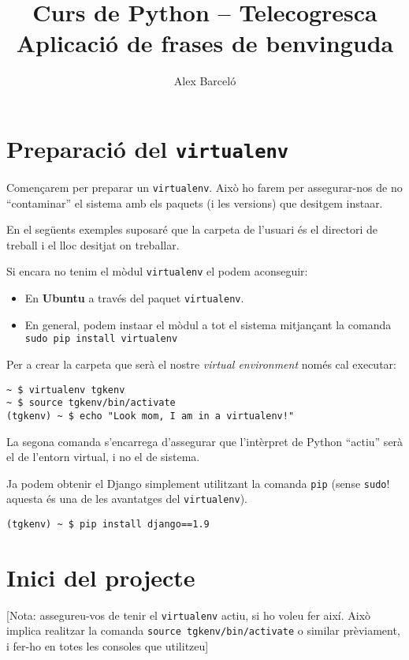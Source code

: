 \documentclass[12pt,a4paper]{article}
\author{Alex Barceló}
\title{Curs de Python -- Telecogresca \\ {\sc Aplicació de frases de benvinguda}}
\begin{document}
\maketitle

\setcounter{section}{-1}
\section{Preparació del \texttt{virtualenv}}

Començarem per preparar un \verb+virtualenv+. Això ho farem per assegurar-nos de no ``contaminar'' el sistema amb els paquets (i les versions) que desitgem insta\lgem{}ar.

En el següents exemples suposaré que la carpeta de l'usuari és el directori de treball i el lloc desitjat on treballar.

Si encara no tenim el mòdul \verb+virtualenv+ el podem aconseguir:
\begin{itemize}
\item En \textbf{Ubuntu} a través del paquet \verb+virtualenv+.
\item En general, podem insta\lgem{}ar el mòdul a tot el sistema mitjançant la comanda \verb+sudo pip install virtualenv+
\end{itemize}

Per a crear la carpeta que serà el nostre \emph{virtual environment} només cal executar:

\begin{verbatim}
~ $ virtualenv tgkenv
~ $ source tgkenv/bin/activate
(tgkenv) ~ $ echo "Look mom, I am in a virtualenv!"
\end{verbatim}

La segona comanda s'encarrega d'assegurar que l'intèrpret de Python ``actiu'' serà el de l'entorn virtual, i no el de sistema.

Ja podem obtenir el Django simplement utilitzant la comanda \verb+pip+ (sense \verb+sudo+! aquesta és una de les avantatges del \verb+virtualenv+).

\begin{verbatim}
(tgkenv) ~ $ pip install django==1.9
\end{verbatim}

\section{Inici del projecte}

[Nota: assegureu-vos de tenir el \verb+virtualenv+ actiu, si ho voleu fer així. Això implica realitzar la comanda \verb+source tgkenv/bin/activate+ o similar prèviament, i fer-ho en totes les consoles que utilitzeu]
\end{document}
